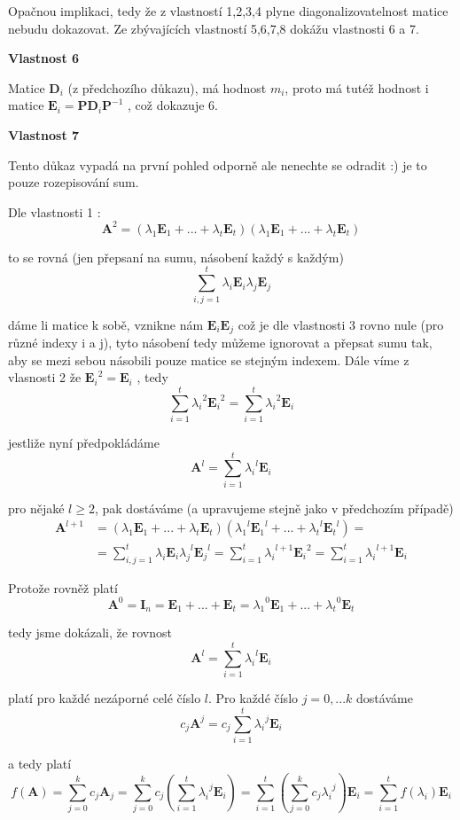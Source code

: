 \begin{dukaz}
Opačnou implikaci, tedy že z vlastností 1,2,3,4 plyne diagonalizovatelnost matice nebudu dokazovat. Ze zbývajících vlastností 5,6,7,8 dokážu vlastnosti 6 a 7.

\bigskip
\noindent \textbf{Vlastnost 6}

Matice $\textbf{D}_i$ (z předchozího důkazu), má hodnost $m_i$, proto má tutéž hodnost i matice $\textbf{E}_i = \textbf{P}\textbf{D}_i\textbf{P}^{-1}$ , což dokazuje 6.

\bigskip
\noindent \textbf{Vlastnost 7}

Tento důkaz vypadá na první pohled odporně ale nenechte se odradit :) je to pouze rozepisování sum.

\bigskip
\noindent Dle vlastnosti 1 :
$$\textbf{A}^2 = (\lambda_1\textbf{E}_1 + ... + \lambda_t\textbf{E}_t)(\lambda_1\textbf{E}_1 + ... + \lambda_t\textbf{E}_t)$$

\noindent to se rovná (jen přepsaní na sumu, násobení každý s každým)
$$\sum_{i,j=1}^t \lambda_i \textbf{E}_i \lambda_j \textbf{E}_j$$

\noindent dáme li matice k sobě, vznikne nám $\textbf{E}_i\textbf{E}_j$ což je dle vlastnosti 3 rovno nule (pro různé indexy i a j), tyto násobení tedy můžeme ignorovat a přepsat sumu tak, aby se mezi sebou násobili pouze matice se stejným indexem. Dále víme z vlasnosti 2 že ${\textbf{E}_i}^2 = \textbf{E}_i$ , tedy
$$\sum_{i=1}^t {\lambda_i}^2 {\textbf{E}_i}^2 = \sum_{i=1}^t {\lambda_i}^2 {\textbf{E}_i}$$

\noindent jestliže nyní předpokládáme
$$\textbf{A}^l = \sum_{i=1}^t {\lambda_i}^l {\textbf{E}_i}$$

\noindent pro nějaké $l\geq2$, pak dostáváme (a upravujeme stejně jako v předchozím případě)
\begin{equation*}
\begin{split}
\textbf{A}^{l+1} & = (\lambda_1\textbf{E}_1 + ... + \lambda_t\textbf{E}_t)({\lambda_1}^l{\textbf{E}_1}^l + ... + {\lambda_t}^l{\textbf{E}_t}^l) =\\
& = \sum_{i,j=1}^t \lambda_i \textbf{E}_i {\lambda_j}^l {\textbf{E}_j}^l = \sum_{i=1}^t {\lambda_i}^{l+1} {\textbf{E}_i}^2 = \sum_{i=1}^t {\lambda_i}^{l+1} \textbf{E}_i
\end{split}
\end{equation*}

\noindent Protože rovněž platí
$$\textbf{A}^0 = \textbf{I}_n = \textbf{E}_1 + ... + \textbf{E}_t = {\lambda_1}^0 \textbf{E}_1 + ... + {\lambda_t}^0 \textbf{E}_t$$

\noindent tedy jsme dokázali, že rovnost
$$\textbf{A}^l = \sum_{i=1}^t {\lambda_i}^l {\textbf{E}_i}$$

\noindent platí pro každé nezáporné celé číslo $l$. Pro každé číslo $j = 0,...k$ dostáváme
$$c_j \textbf{A}^j = c_j \sum_{i=1}^t {\lambda_i}^j {\textbf{E}_i}$$

\noindent a tedy platí
$$f(\textbf{A}) = \sum_{j=0}^k c_j{\textbf{A}_j} = \sum_{j=0}^k c_j(\sum_{i=1}^t {\lambda_i}^j {\textbf{E}_i}) = \sum_{i=1}^t (\sum_{j=0}^k c_j {\lambda_i}^j){\textbf{E}_i} = \sum_{i=1}^t f(\lambda_i) \textbf{E}_i$$
\end{dukaz}
